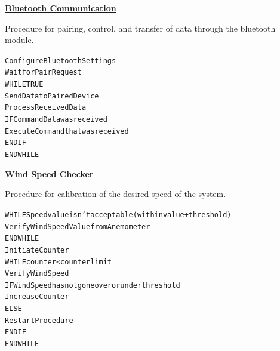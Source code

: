 		\underline{\textbf{Bluetooth Communication}}

		Procedure for pairing, control, and transfer of data through the bluetooth module.
		\begin{framed}
		\begin{alltt}
			        Configure Bluetooth Settings
			        Wait for Pair Request
			        \color{fushia}WHILE TRUE\color{black}
			            Send Data to Paired Device
			            Process Received Data
			            \color{fushia}IF\color{black} Command Data was received
			                Execute Command that was received
			            \color{fushia}ENDIF\color{black}
			        \color{fushia}ENDWHILE\color{black}
		\end{alltt}
		\end{framed}
		\underline{\textbf{Wind Speed Checker}}
		
		Procedure for calibration of the desired speed of the system.
		\begin{framed}
		\begin{alltt}	 
			        \color{fushia}WHILE\color{black} Speed value isn’t acceptable (within value + threshold)
			            Verify Wind Speed Value from Anemometer
			        \color{fushia}ENDWHILE\color{black}
			        Initiate Counter
			        \color{fushia}WHILE\color{black} counter < counter limit
			            Verify Wind Speed
			            \color{fushia}IF\color{black} Wind Speed has not gone over or under threshold
			                Increase Counter
			            \color{fushia}ELSE\color{black}
			                Restart Procedure
			            \color{fushia}ENDIF\color{black}
			        \color{fushia}ENDWHILE\color{black}
		\end{alltt}
		\end{framed}

